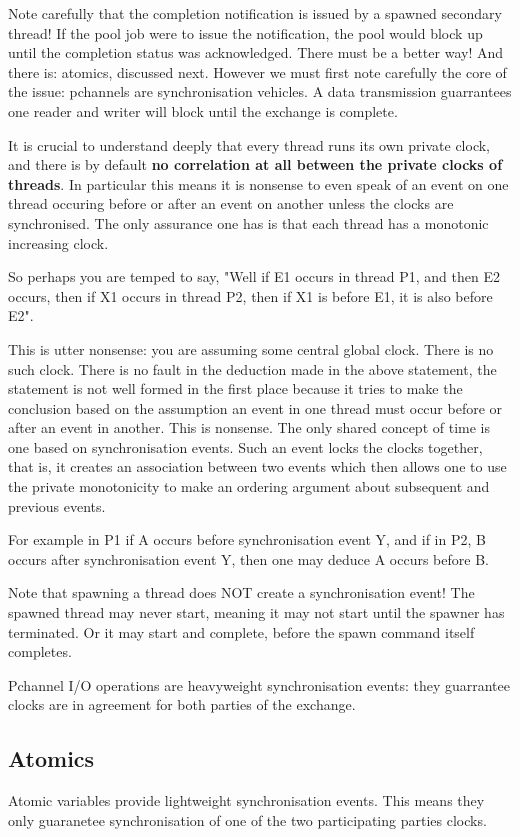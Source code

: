 \documentclass[oneside]{book}
\begin{document}
Note carefully that the completion notification is issued
by a spawned secondary thread! If the pool job were to 
issue the notification, the pool would block up until
the completion status was acknowledged. There must be a better
way! And there is: atomics, discussed next. However we must
first note carefully the core of the issue: pchannels are
synchronisation vehicles. A data transmission guarrantees
one reader and writer will block until the exchange
is complete. 

It is crucial to understand deeply that
every thread runs its own private clock,
and there is by default {\bf no correlation at all
between the private clocks of threads}. In particular
this means it is nonsense to even speak of an event on
one thread occuring before or after an event on another
unless the clocks are synchronised. The only assurance
one has is that each thread has a monotonic increasing
clock.

So perhaps you are temped to say, "Well if E1 occurs in
thread P1, and then E2 occurs, then if X1 occurs in 
thread P2, then if X1 is before E1, it is also before
E2".

This is utter nonsense: you are assuming some central
global clock. There is no such clock. There is no fault
in the deduction made in the above statement, the statement
is not well formed in the first place because it tries
to make the conclusion based on the assumption an event
in one thread must occur before or after an event in another.
This is nonsense. The only shared concept of time is one
based on synchronisation events. Such an event locks the
clocks together, that is, it creates an association between
two events which then allows one to use the private monotonicity
to make an ordering argument about subsequent and previous events.

For example in P1 if A occurs before synchronisation event Y,
and if in P2, B occurs after synchronisation event Y, then
one may deduce A occurs before B.

Note that spawning a thread does NOT create a synchronisation
event! The spawned thread may never start, meaning it may not
start until the spawner has terminated. Or it may start
and complete, before the spawn command itself completes.

Pchannel I/O operations are heavyweight synchronisation events:
they guarrantee clocks are in agreement for both parties
of the exchange.

\subsection{Atomics}
Atomic variables provide lightweight synchronisation events.
This means they only guaranetee synchronisation of one of the
two participating parties clocks.
\end{document}
